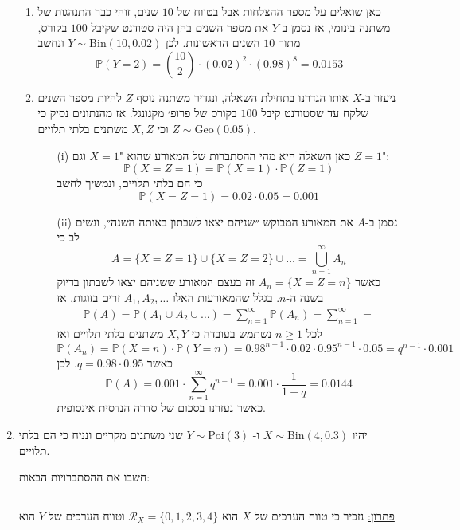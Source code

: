 \documentclass[12pt, a4paper]{article}
\newcommand{\cR}{\mathcal{R}}
\newcommand{\PP}{\mathbb{P}}
\newcommand{\Geo}{\mathrm{Geo}}
\newcommand{\Bin}{\mathrm{Bin}}
\begin{document}
\begin{enumerate}
\begin{enumerate}
\item
כאן שואלים על מספר ההצלחות אבל בטווח של
$10$
שנים, זוהי כבר התנהגות של משתנה בינומי, אז נסמן ב-$Y$
את מספר השנים בהן היה סטודנט שקיבל
$100$
בקורס, מתוך 
$10$
השנים הראשונות. לכן
$Y\sim \Bin(10,0.02)$
ונחשב
$$\PP(Y=2)
=\binom{10}{2}\cdot
(0.02)^2\cdot(0.98)^8=0.0153$$
\item
ניעזר ב-$X$
אותו הגדרנו בתחילת השאלה, ונגדיר משתנה נוסף
$Z$
להיות מספר  השנים שלקח עד שסטודנט קיבל
$100$
בקורס של פרופ׳ מקגונגל. אז מהנתונים נסיק כי
$Z\sim\Geo(0.05)$
וכי
$X,Z$
משתנים בלתי תלויים.
\begin{enumerate}
\item[(i)]
כאן  השאלה היא מהי ההסתברות של המאורע שהוא
"$X=1$
וגם
$Z=1$":
$$\PP(X=Z=1)=\PP(X=1)\cdot \PP(Z=1)$$
כי הם בלתי תלויים, ונמשיך לחשב
$$\PP(X=Z=1)
=0.02\cdot 0.05
=0.001$$
\item[(ii)]
נסמן ב-$A$
את המאורע המבוקש ״שניהם יצאו לשבתון באותה השנה״, ונשים לב כי
$$A=
\{X=Z=1\}\cup\{X=Z=2\}\cup\ldots=
\bigcup_{n=1}^{\infty}
A_n$$
כאשר
$A_n=\{ X=Z=n\}$
זה בעצם המאורע ששניהם יצאו לשבתון בדיוק בשנה ה-$n$.
בגלל שהמאורעות האלו
$A_1,A_2,\ldots$
זרים בזוגות, אז
\begin{align*}
\PP(A)=\PP(A_1\cup A_2\cup\ldots)=
\sum_{n=1}^{\infty}
\PP(A_n)
=\sum_{n=1}^{\infty}=
\end{align*}
לכל
$n\ge1$
נשתמש בעובדה כי
$X,Y$
משתנים בלתי תלויים ואז
$$\PP(A_n)=\PP(X=n)\cdot \PP(Y=n)
=0.98^{n-1}\cdot 0.02\cdot 0.95^{n-1}\cdot 0.05
=q^{n-1}\cdot 0.001$$
כאשר
$q=0.98\cdot 0.95$.
לכן
$$\PP(A)=0.001\cdot
\sum_{n=1}^{\infty}
q^{n-1}
=0.001\cdot
\frac{1}{1-q}=0.0144$$
כאשר נעזרנו בסכום של סדרה הנדסית אינסופית.
\end{enumerate}
\end{enumerate}

\newpage
\item
יהיו
$X\sim \Bin(4,0.3)$
ו-
$Y\sim \mathrm{Poi}(3)$
שני משתנים מקריים
ונניח כי הם
 בלתי תלויים.

חשבו את ההסתברויות הבאות:
\begin{enumerate}
\end{enumerate}

\noindent\rule{15cm}{0.4pt}

\underline{פתרון:}
נזכיר כי טווח הערכים של 
$X$
 הוא
 $\cR_X=
 \{0,1,2,3,4\}$
 וטווח הערכים של
 $Y$
 הוא
 

\end{enumerate}
\end{document}

